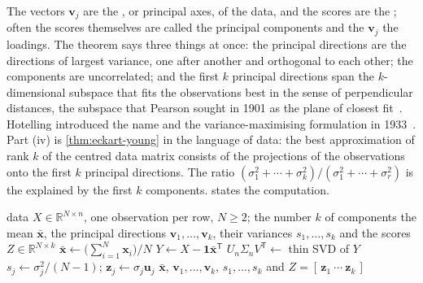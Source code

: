 The vectors $\mathbf v_j$ are the , or principal axes, of the data, and the scores are the ; often the scores themselves are called the principal components and the $\mathbf v_j$ the loadings. The theorem says three things at once: the principal directions are the directions of largest variance, one after another and orthogonal to each other; the components are uncorrelated; and the first $k$ principal directions span the $k$-dimensional subspace that fits the observations best in the sense of perpendicular distances, the subspace that Pearson sought in 1901 as the plane of closest fit~\cite{pearson1901}. Hotelling introduced the name and the variance-maximising formulation in 1933~\cite{hotelling1933}. Part (iv) is \cref{thm:eckart-young} in the language of data: the best approximation of rank $k$ of the centred data matrix consists of the projections of the observations onto the first $k$ principal directions. The ratio $(\sigma_1^2+\cdots+\sigma_k^2)/(\sigma_1^2+\cdots+\sigma_r^2)$ is the  explained by the first $k$ components.  states the computation.

\begin{algorithm}
\begin{algorithmic}[1]
\Require data $X\in\mathbb R^{N\times n}$, one observation per row, $N\ge2$; the number $k$ of components
\Ensure the mean $\bar{\mathbf x}$, the principal directions $\mathbf v_1,\ldots,\mathbf v_k$, their variances $s_1,\ldots,s_k$ and the scores $Z\in\mathbb R^{N\times k}$
\State $\bar{\mathbf x}\gets\bigl(\sum_{i=1}^N\mathbf x_i\bigr)/N$ 
\State $Y\gets X-\mathbf 1\bar{\mathbf x}^{\mathsf T}$ 
\State $U_n\Sigma_nV^{\mathsf T}\gets$ thin SVD of $Y$ 
  \State $s_j\gets\sigma_j^2/(N-1)$; $\mathbf z_j\gets\sigma_j\mathbf u_j$ 
\EndFor
\State \Return $\bar{\mathbf x}$, $\mathbf v_1,\ldots,\mathbf v_k$, $s_1,\ldots,s_k$ and $Z=[\,\mathbf z_1\ \cdots\ \mathbf z_k\,]$
\end{algorithmic}
\caption{Principal component analysis by the singular value decomposition (\cref{thm:pca}). The approximation of the data by $k$ components is $\mathbf 1\bar{\mathbf x}^{\mathsf T}+ZV_k^{\mathsf T}$. The cost is dominated by the thin SVD, of the order of $Nn^2$ operations for $N\ge n$ (Volume~IX).}
\label{alg:pca}
\end{algorithm}

